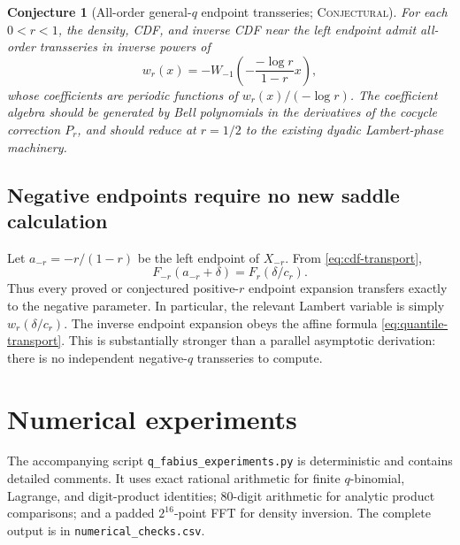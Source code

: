\documentclass[11pt,oneside]{article}
\newtheorem{conjecture}[theorem]{Conjecture}
\theoremstyle{definition}
\theoremstyle{remark}
\newcommand{\Conjectural}{\textsc{Conjectural}}
\begin{document}
\begin{conjecture}[All-order general-\(q\) endpoint transseries;
\Conjectural]\label{conj:lambert-allorder}
For each \(0<r<1\), the density, CDF, and inverse CDF near the left endpoint
admit all-order transseries in inverse powers of
\[
 w_r(x)=-W_{-1}\!\left(-\frac{-\log r}{1-r}x\right),
\]
whose coefficients are periodic functions of \(w_r(x)/(-\log r)\).  The
coefficient algebra should be generated by Bell polynomials in the derivatives
of the cocycle correction \(P_r\), and should reduce at \(r=1/2\) to the
existing dyadic Lambert-phase machinery.
\end{conjecture}

\subsection{Negative endpoints require no new saddle calculation}
Let \(a_{-r}=-r/(1-r)\) be the left endpoint of \(X_{-r}\).  From
\eqref{eq:cdf-transport},
\begin{equation}\label{eq:negative-endpoint-transfer}
 F_{-r}(a_{-r}+\delta)=F_r(\delta/c_r).
\end{equation}
Thus every proved or conjectured positive-\(r\) endpoint expansion transfers
exactly to the negative parameter.  In particular, the relevant Lambert
variable is simply \(w_r(\delta/c_r)\).  The inverse endpoint expansion obeys
the affine formula \eqref{eq:quantile-transport}.  This is substantially
stronger than a parallel asymptotic derivation: there is no independent
negative-\(q\) transseries to compute.

\section{Numerical experiments}

The accompanying script \texttt{q\_fabius\_experiments.py} is deterministic and
contains detailed comments.  It uses exact rational arithmetic for finite
\(q\)-binomial, Lagrange, and digit-product identities; 80-digit arithmetic for
analytic product comparisons; and a padded \(2^{16}\)-point FFT for density
inversion.  The complete output is in \texttt{numerical\_checks.csv}.
\end{document}
